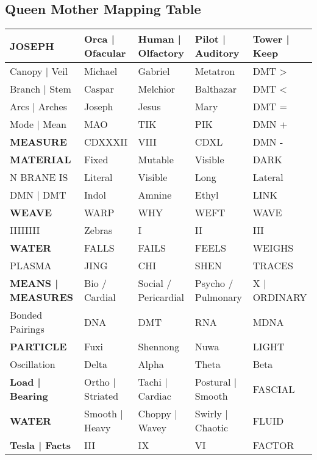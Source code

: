\documentclass{article}
\begin{document}
\begin{landscape}

\section*{Queen Mother Mapping Table}

\begin{tabularx}{\linewidth}{>{\raggedright\arraybackslash}p{4.2cm} 
                               >{\raggedright\arraybackslash}p{3.2cm} 
                               >{\raggedright\arraybackslash}p{3.2cm} 
                               >{\raggedright\arraybackslash}p{3.2cm} 
                               >{\raggedright\arraybackslash}p{3.2cm}}
\toprule
\textbf{JOSEPH} & \textbf{Orca | Ofacular} & \textbf{Human | Olfactory} & \textbf{Pilot | Auditory} & \textbf{Tower | Keep} \\
\midrule
Canopy | Veil & Michael & Gabriel & Metatron & DMT > \\
Branch | Stem & Caspar & Melchior & Balthazar & DMT < \\
Arcs | Arches & Joseph & Jesus & Mary & DMT = \\
Mode | Mean & MAO & TIK & PIK & DMN + \\
\textbf{MEASURE} & CDXXXII & VIII & CDXL & DMN - \\
\textbf{MATERIAL} & Fixed & Mutable & Visible & DARK \\
N BRANE IS & Literal & Visible & Long & Lateral \\
DMN | DMT & Indol & Amnine & Ethyl & LINK \\
\textbf{WEAVE} & WARP & WHY & WEFT & WAVE \\
IIIIIIII & Zebras & I & II & III \\
\textbf{WATER} & FALLS & FAILS & FEELS & WEIGHS \\
PLASMA & JING & CHI & SHEN & TRACES \\
\textbf{MEANS | MEASURES} & Bio / Cardial & Social / Pericardial & Psycho / Pulmonary & X | ORDINARY \\
Bonded Pairings & DNA & DMT & RNA & MDNA \\
\textbf{PARTICLE} & Fuxi & Shennong & Nuwa & LIGHT \\
Oscillation & Delta & Alpha & Theta & Beta \\
\textbf{Load | Bearing} & Ortho | Striated & Tachi | Cardiac & Postural | Smooth & FASCIAL \\
\textbf{WATER} & Smooth | Heavy & Choppy | Wavey & Swirly | Chaotic & FLUID \\
\textbf{Tesla | Facts} & III & IX & VI & FACTOR \\
\bottomrule
\end{tabularx}

\end{landscape}
\end{document}
